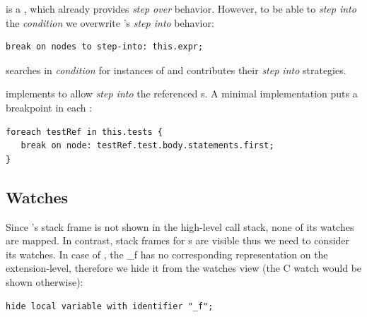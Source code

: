  is a , which
already provides \emph{step over} behavior. However, to be able to 
\emph{step into} the \emph{condition} we overwrite 's 
\emph{step into} behavior: 
\begin{lstlisting}[language=debuggerDSL,frame=single]
break on nodes to step-into: this.expr;
\end{lstlisting}

 searches in \emph{condition}
for instances of  and contributes their 
\emph{step into} strategies.

 implements  to allow 
\emph{step into} the referenced s. A  
minimal implementation puts a breakpoint in each :
\begin{lstlisting}[language=debuggerDSL,frame=single]
foreach testRef in this.tests { 
   break on node: testRef.test.body.statements.first;
}
\end{lstlisting}

\subsection{Watches} 

Since 's  stack frame is not shown in the high-level
call stack, none of its watches are mapped.
In contrast,  stack frames for s are visible thus we need
to consider its watches. In case of , the 
 \_f has no corresponding
representation on the extension-level, therefore we hide it from the watches view (the C watch
would be shown otherwise):

\begin{lstlisting}[frame=single,language=debuggerDSL]
hide local variable with identifier "_f";
\end{lstlisting}